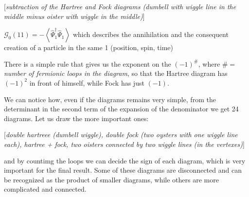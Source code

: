 [\textit{subtraction of the Hartree and Fock diagrams (dumbell with wiggle line in the middle minus oister with wiggle in the middle)}]

\(\mathcal{G}_0(11) = - \left\langle \hat{\Psi}_1^\dagger \hat{\Psi}_1 \right\rangle\) which describes the annihilation and the consequent creation of a particle in the same 1 (position, spin, time)

There is a simple rule that gives us the exponent on the \((-1)^{\#}\), where \(\# =\)\textit{number of fermionic loops in the diagram}, so that the Hartree diagram has \((-1)^2\) in front of himself, while Fock has just \((-1)\).

We can notice how, even if the diagrams remains very simple, from the determinant in the second term of the expansion of the denominator we get 24 diagrams. Let us draw the more important ones:

[\textit{double hartreee (dumbell wiggle), double fock (two oysters with one wiggle line each), hartree + fock, two oisters connected by two wiggle lines (in the vertexes)}]

and by countimg the loops we can decide the sign of each diagram, which is very important for the final result. Some of these diagrams are disconnected and can be recognized as the product of smaller diagrams, while others are more complicated and connected.

